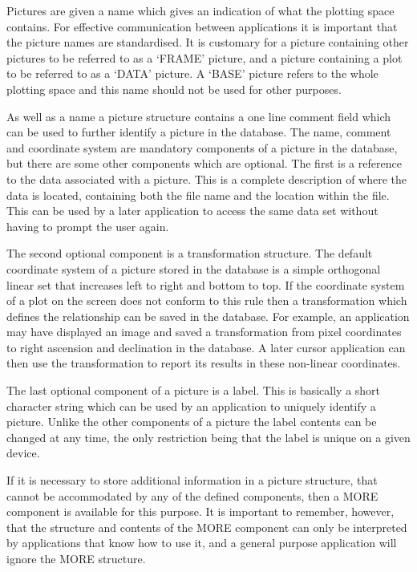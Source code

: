 \documentclass[twoside,11pt]{article}
\renewcommand{\_}{\texttt{\symbol{95}}}
\begin{document}
Pictures are given a name which gives an indication of what the plotting
space contains. For effective communication between applications it is
important that the picture names are standardised. It is customary for
a picture containing other pictures to be referred to as a `FRAME' picture,
and a picture containing a plot to be referred to as a `DATA' picture.
A `BASE' picture refers to the whole plotting space and this name should
not be used for other purposes.

As well as a name a picture structure contains a one line comment field
which can be used to further identify a picture in the database. The name,
comment and coordinate system are mandatory components of a picture in
the database, but there are some other components which are optional.
The first is a reference to the data associated with a picture. This
is a complete description of where the data is located, containing both
the file name and the location within the file. This can be used by a
later application to access the same data set without having to prompt
the user again.

The second optional component is a transformation structure.
The default coordinate system of a picture stored in the database is a
simple orthogonal linear set that increases left to right and bottom to top.
If the coordinate system of a plot on the screen does not conform to this
rule then a transformation which defines the relationship can
be saved in the database.
For example, an application may have displayed an image and saved a
transformation from pixel coordinates to right ascension and declination
in the database. A later cursor application can then use the transformation
to report its results in these non-linear coordinates.

The last optional component of a picture is a label. This is basically a
short character string which can be used by an application to uniquely
identify a picture. Unlike the other components of a picture the label
contents can be changed at any time, the only restriction being that
the label is unique on a given device.

If it is necessary to store additional information in a picture
structure, that cannot be accommodated by any of the defined components,
then a MORE component is available for this purpose. It is important to
remember, however, that the structure and contents of the MORE component
can only be interpreted by applications that know how to use it, and
a general purpose application will ignore the MORE structure.
\end{document}
